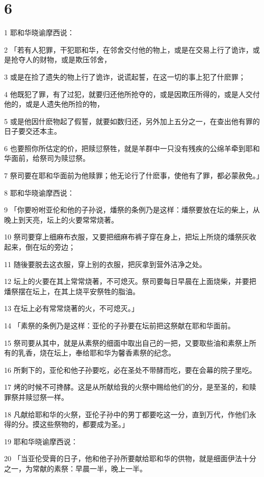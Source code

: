 \chapter{6}

\par 1 耶和华晓谕摩西说：
\par 2 「若有人犯罪，干犯耶和华，在邻舍交付他的物上，或是在交易上行了诡诈，或是抢夺人的财物，或是欺压邻舍，
\par 3 或是在捡了遗失的物上行了诡诈，说谎起誓，在这一切的事上犯了什麽罪；
\par 4 他既犯了罪，有了过犯，就要归还他所抢夺的，或是因欺压所得的，或是人交付他的，或是人遗失他所捡的物，
\par 5 或是他因什麽物起了假誓，就要如数归还，另外加上五分之一，在查出他有罪的日子要交还本主。
\par 6 也要照你所估定的价，把赎愆祭牲，就是羊群中一只没有残疾的公绵羊牵到耶和华面前，给祭司为赎愆祭。
\par 7 祭司要在耶和华面前为他赎罪；他无论行了什麽事，使他有了罪，都必蒙赦免。」
\par 8 耶和华晓谕摩西说：
\par 9 「你要吩咐亚伦和他的子孙说，燔祭的条例乃是这样：燔祭要放在坛的柴上，从晚上到天亮，坛上的火要常常烧著。
\par 10 祭司要穿上细麻布衣服，又要把细麻布裤子穿在身上，把坛上所烧的燔祭灰收起来，倒在坛的旁边；
\par 11 随後要脱去这衣服，穿上别的衣服，把灰拿到营外洁净之处。
\par 12 坛上的火要在其上常常烧著，不可熄灭。祭司要每日早晨在上面烧柴，并要把燔祭摆在坛上，在其上烧平安祭牲的脂油。
\par 13 在坛上必有常常烧著的火，不可熄灭。」
\par 14 「素祭的条例乃是这样：亚伦的子孙要在坛前把这祭献在耶和华面前。
\par 15 祭司要从其中，就是从素祭的细面中取出自己的一把，又要取些油和素祭上所有的乳香，烧在坛上，奉给耶和华为馨香素祭的纪念。
\par 16 所剩下的，亚伦和他子孙要吃，必在圣处不带酵而吃，要在会幕的院子里吃。
\par 17 烤的时候不可搀酵。这是从所献给我的火祭中赐给他们的分，是至圣的，和赎罪祭并赎愆祭一样。
\par 18 凡献给耶和华的火祭，亚伦子孙中的男丁都要吃这一分，直到万代，作他们永得的分。摸这些祭物的，都要成为圣。」
\par 19 耶和华晓谕摩西说：
\par 20 「当亚伦受膏的日子，他和他子孙所要献给耶和华的供物，就是细面伊法十分之一，为常献的素祭：早晨一半，晚上一半。

